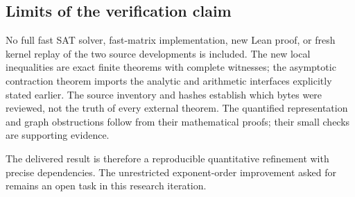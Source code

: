 \subsection{Limits of the verification claim}

No full fast SAT solver, fast-matrix implementation, new Lean proof, or
fresh kernel replay of the two source developments is included. The
new local inequalities are exact finite theorems with complete witnesses;
the asymptotic contraction theorem imports the analytic and arithmetic
interfaces explicitly stated earlier. The source inventory and hashes
establish which bytes were reviewed, not the truth of every external
theorem. The quantified representation and graph obstructions follow from
their mathematical proofs; their small checks are supporting evidence.

The delivered result is therefore a reproducible quantitative refinement
with precise dependencies. The unrestricted exponent-order improvement
asked for remains an open task in this research iteration.
